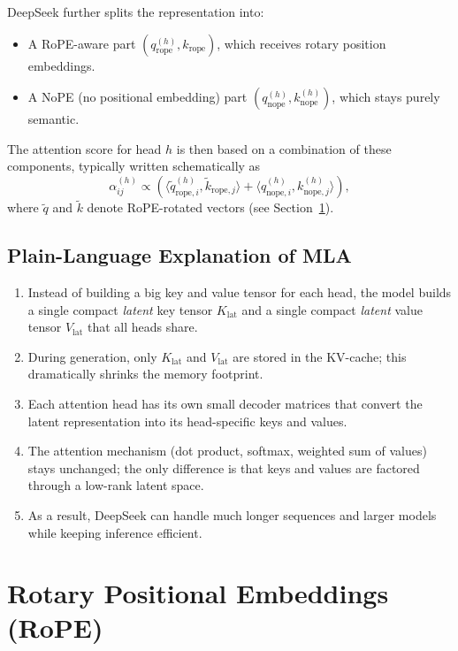 \documentclass[11pt]{article}
\theoremstyle{remark}
\begin{document}
DeepSeek further splits the representation into:
\begin{itemize}
  \item A RoPE-aware part $(q_{\text{rope}}^{(h)}, k_{\text{rope}})$, which receives rotary position embeddings.
  \item A NoPE (no positional embedding) part $(q_{\text{nope}}^{(h)}, k_{\text{nope}}^{(h)})$, which stays purely semantic.
\end{itemize}

The attention score for head $h$ is then based on a combination of these components, typically written schematically as
\[
\alpha^{(h)}_{ij} \propto
\left(
\langle \tilde{q}^{(h)}_{\text{rope}, i}, \tilde{k}_{\text{rope}, j} \rangle
+
\langle q^{(h)}_{\text{nope}, i}, k^{(h)}_{\text{nope}, j} \rangle
\right),
\]
where $\tilde{q}$ and $\tilde{k}$ denote RoPE-rotated vectors (see Section~\ref{sec:rope}).

\subsection{Plain-Language Explanation of MLA}

\begin{enumerate}[label=\arabic*)]
  \item Instead of building a big key and value tensor for each head, the model builds a single compact \emph{latent} key tensor $K_{\text{lat}}$ and a single compact \emph{latent} value tensor $V_{\text{lat}}$ that all heads share.
  \item During generation, only $K_{\text{lat}}$ and $V_{\text{lat}}$ are stored in the KV-cache; this dramatically shrinks the memory footprint.
  \item Each attention head has its own small decoder matrices that convert the latent representation into its head-specific keys and values.
  \item The attention mechanism (dot product, softmax, weighted sum of values) stays unchanged; the only difference is that keys and values are factored through a low-rank latent space.
  \item As a result, DeepSeek can handle much longer sequences and larger models while keeping inference efficient.
\end{enumerate}

\section{Rotary Positional Embeddings (RoPE)}
\label{sec:rope}
\end{document}
